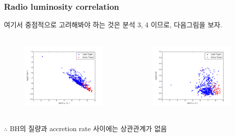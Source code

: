 \documentclass[xcolor={dvipsnames,table}]{beamer}
\newcommand\NM{\fontsize{9}{7.2}\selectfont}
\begin{document}
\begin{frame}
 \frametitle{Radio luminosity correlation}
 \NM
 여기서 중점적으로 고려해봐야 하는 것은 분석 3, 4 이므로, 다음그림을 보자.
  \begin{columns}
   \begin{figure}
    \centering
    \includegraphics[width=5cm, height=3.5cm]{acceffi.png}
   \end{figure}
   \begin{figure}
    \centering
    \includegraphics[width=5cm, height=3.5cm]{cor.png}
   \end{figure}
  \end{columns}
  \vspace{0.2cm}
$\therefore$ BH의 질량과 accretion rate 사이에는 상관관계가 없음
\end{frame}
\end{document}
